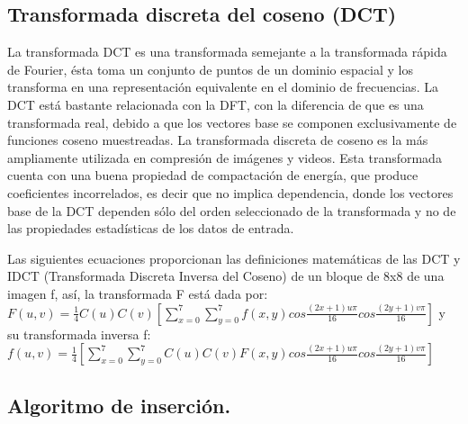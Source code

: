 \documentclass[12pt]{article}
\begin{document}
\subsection{Transformada discreta del coseno (DCT)}
La transformada DCT es una transformada semejante a la transformada rápida de Fourier, ésta toma un conjunto de puntos de un dominio espacial y los transforma en una representación equivalente en el dominio de frecuencias. La DCT está bastante relacionada con la DFT, con la diferencia de que es una transformada real, debido a que los vectores base se componen exclusivamente de funciones coseno muestreadas. La transformada discreta de coseno es la más ampliamente utilizada en compresión de imágenes y videos. Esta transformada cuenta con una buena propiedad de compactación de energía, que produce coeficientes incorrelados, es decir que no implica dependencia, donde los vectores base de la DCT dependen sólo del orden seleccionado de la transformada y no de las propiedades estadísticas de los datos de entrada.

Las siguientes ecuaciones proporcionan las definiciones matemáticas de las DCT y IDCT (Transformada Discreta Inversa del Coseno) de un bloque de 8x8 de una imagen f, así, la transformada F está dada por:
\newline
\textbf {
	$F(u, v) = \frac{1}{4}C(u)C(v)[\sum_{x=0}^{7}\sum_{y=0}^{7}f(x, y)cos \frac{(2x + 1)u\pi}{16}cos \frac{(2y + 1)v\pi}{16}]$
}
\newline
y su transformada  inversa f:
\newline
\textbf {
	$f(u, v) = \frac{1}{4}[\sum_{x=0}^{7}\sum_{y=0}^{7}C(u)C(v)F(x, y)cos \frac{(2x + 1)u\pi}{16}cos \frac{(2y + 1)v\pi}{16}]$
}
\newline
\cite{Esqueda}
\newpage


\subsection{Algoritmo de inserción.}
\end{document}

